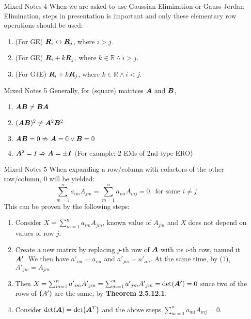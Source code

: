 \documentclass[11pt,landscape]{article}
\begin{document}
\begin{multicols}{2}
\begin{justifying}
\begin{namedthm*}{Mixed Notes 4}
	When we are asked to use Gaussian Elimination or Gauss-Jordan Elimination, steps in presentation is important and only these elementary row operations should be used:
	\begin{enumerate}
		\item (For GE) \(\bm{R}_i \leftrightarrow \bm{R}_j\), where \(i > j\).
		\item (For GE) \(\bm{R}_i + k\bm{R}_j\), where \(k \in \mathbb{R} \land i > j\).
		\item (For GJE) \(\bm{R}_i + k\bm{R}_j\), where \(k \in \mathbb{R} \land i < j\).
	\end{enumerate}
\end{namedthm*}

\begin{namedthm*}{Mixed Notes 5}
	Generally, for (square) matrices \(\bm{A}\) and \(\bm{B}\),
	\begin{enumerate}
		\item \(\bm{AB} \ne \bm{BA}\)
		\item \((\bm{AB})^2 \ne \bm{A}^2\bm{B}^2\)
		\item \(\bm{AB} = 0 \nRightarrow \bm{A} = 0 \lor \bm{B} = 0\)
		\item \(\bm{A}^2 = I \nRightarrow \bm{A} = \pm \bm{I}\) (For example: 2 EMs of 2nd type ERO)
	\end{enumerate}
\end{namedthm*}

\begin{namedthm*}{Mixed Notes 5}
	When expanding a row/column with cofactors of the other row/column, 0 will be yielded:
	\[
	    \sum_{m=1}^n a_{im}A_{jm} = \sum_{m=1}^n a_{mi}A_{mj} = 0, \text{ for some } i \ne j
	\]
	This can be proven by the following steps:
	\begin{enumerate}
		\item Consider \(X = \sum_{m=1}^n a_{im}A_{jm}\), known value of \(A_{jm}\) and \(X\) does not depend on values of row \(j\).
		\item Create a new matrix by replacing \(j\)-th row of \(\bm{A}\) with its \(i\)-th row, named it \(\bm{A'}\). We then have \({a'}_{im} = {a}_{im}\) and \({a'}_{jm} = {a'}_{im}\). At the same time, by (1), \({A'}_{jm} = A_{jm}\)
		\item Then \(X = \sum_{m=1}^n {a'}_{im}{A'}_{jm} = \sum_{m=1}^n {a'}_{jm}{A'}_{jm} = \det(\bm{A'}) = 0\) since two of the rows of \(\bm{(}A')\) are the same, by \textbf{Theorem 2.5.12.1}.
		\item Consider \(\det(\bm{A}) = \det(\bm{A}^T)\) and the above steps \(\sum_{m=1}^n a_{mi}A_{mj} = 0\).
		\end{enumerate}
\end{namedthm*}


\end{justifying}
\end{multicols}
\end{document}
